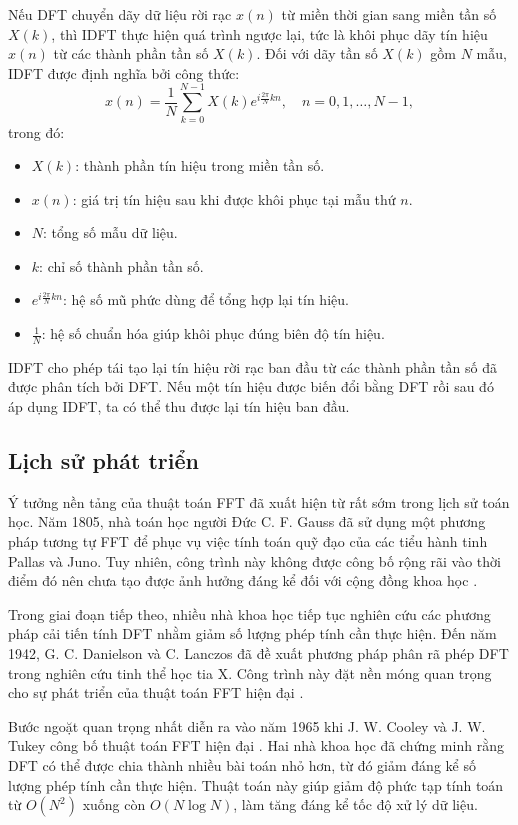 Nếu DFT chuyển dãy dữ liệu rời rạc $x(n)$ từ miền thời gian sang miền tần số
$X(k)$, thì IDFT thực hiện quá trình ngược lại, tức là khôi phục dãy tín hiệu
$x(n)$ từ các thành phần tần số $X(k)$. Đối với dãy tần số $X(k)$ gồm $N$ mẫu,
IDFT được định nghĩa bởi công thức:
\begin{equation}
  x(n)=\frac{1}{N}\sum_{k=0}^{N-1}X(k)e^{i\frac{2\pi}{N}kn},
  \quad n=0,1,\ldots,N-1,
\end{equation}
trong đó:
\begin{itemize}
    \item $X(k)$: thành phần tín hiệu trong miền tần số.
    \item $x(n)$: giá trị tín hiệu sau khi được khôi phục tại mẫu thứ $n$.
    \item $N$: tổng số mẫu dữ liệu.
    \item $k$: chỉ số thành phần tần số.
    \item $e^{i\frac{2\pi}{N}kn}$: hệ số mũ phức dùng để tổng hợp lại tín hiệu.
    \item $\frac{1}{N}$: hệ số chuẩn hóa giúp khôi phục đúng biên độ tín hiệu.
\end{itemize}

IDFT cho phép tái tạo lại tín hiệu rời rạc ban đầu từ các thành phần tần số đã
được phân tích bởi DFT. Nếu một tín hiệu được biến đổi bằng DFT rồi sau đó áp
dụng IDFT, ta có thể thu được lại tín hiệu ban đầu.

\subsection{Lịch sử phát triển}

Ý tưởng nền tảng của thuật toán FFT đã xuất hiện từ rất sớm trong lịch sử toán
học. Năm 1805, nhà toán học người Đức C. F. Gauss đã sử dụng một phương pháp
tương tự FFT để phục vụ việc tính toán quỹ đạo của các tiểu hành tinh Pallas
và Juno. Tuy nhiên, công trình này không được công bố rộng rãi vào thời điểm
đó nên chưa tạo được ảnh hưởng đáng kể đối với cộng đồng khoa học
\cite{heideman1984gauss}.

Trong giai đoạn tiếp theo, nhiều nhà khoa học tiếp tục nghiên cứu các phương
pháp cải tiến tính DFT nhằm giảm số lượng phép tính cần thực hiện. Đến năm
1942, G. C. Danielson và C. Lanczos đã đề xuất phương pháp phân rã phép DFT
trong nghiên cứu tinh thể học tia X. Công trình này đặt nền móng quan trọng
cho sự phát triển của thuật toán FFT hiện đại \cite{danielson1942}.

Bước ngoặt quan trọng nhất diễn ra vào năm 1965 khi J. W. Cooley và
J. W. Tukey công bố thuật toán FFT hiện đại \cite{cooley1965algorithm}. Hai
nhà khoa học đã chứng minh rằng DFT có thể được chia thành nhiều bài toán nhỏ
hơn, từ đó giảm đáng kể số lượng phép tính cần thực hiện. Thuật toán này giúp
giảm độ phức tạp tính toán từ $O(N^2)$ xuống còn $O(N \log N)$, làm tăng đáng
kể tốc độ xử lý dữ liệu.

